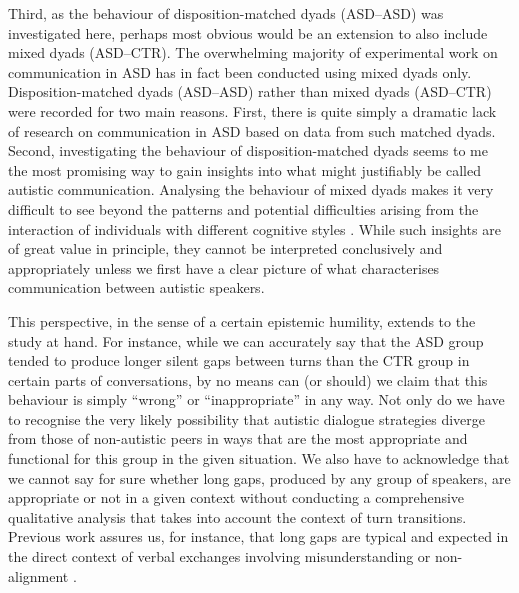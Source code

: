 Third, as the behaviour of disposition-matched dyads (ASD--ASD) was investigated here, perhaps most obvious would be an extension to also include mixed dyads (ASD--CTR). The overwhelming majority of experimental work on communication in ASD has in fact been conducted using mixed dyads only. Disposition-matched dyads (ASD--ASD) rather than mixed dyads (ASD--CTR) were recorded for two main reasons. First, there is quite simply a dramatic lack of research on communication in ASD based on data from such matched dyads. Second, investigating the behaviour of disposition-matched dyads seems to me the most promising way to gain insights into what might justifiably be called autistic communication. Analysing the behaviour of mixed dyads makes it very difficult to see beyond the patterns and potential difficulties arising from the interaction of individuals with different cognitive styles \citep{miltonDoubleEmpathyProblem2020,miltonOntologicalStatusAutism2012,williamsMutualMisUnderstanding2021,mccrackenAutisticIdentityLanguage2021}. While such insights are of great value in principle, they cannot be interpreted conclusively and appropriately unless we first have a clear picture of what characterises communication between autistic speakers.

This perspective, in the sense of a certain epistemic humility, extends to the study at hand. For instance, while we can accurately say that the ASD group tended to produce longer silent gaps between turns than the CTR group in certain parts of conversations, by no means can (or should) we claim that this behaviour is simply “wrong” or “inappropriate” in any way. Not only do we have to recognise the very likely possibility that autistic dialogue strategies diverge from those of non-autistic peers in ways that are the most appropriate and functional for this group in the given situation. We also have to acknowledge that we cannot say for sure whether long gaps, produced by any group of speakers, are appropriate or not in a given context without conducting a comprehensive qualitative analysis that takes into account the context of turn transitions. Previous work assures us, for instance, that long gaps are typical and expected in the direct context of verbal exchanges involving misunderstanding or non-alignment \citep{kendrickTimingConstructionPreference2015a,kendrickIntersectionTurntakingRepair2015,robertsIdentifyingTemporalThreshold2013}.

